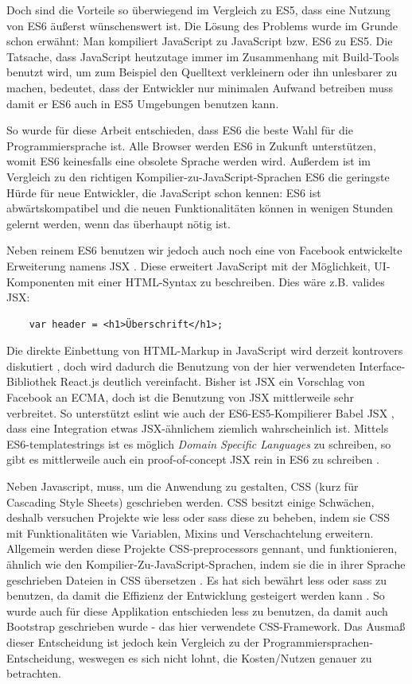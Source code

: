 \documentclass[12pt,twoside]{book}
\begin{document}
Doch sind die Vorteile so überwiegend im Vergleich zu ES5, dass eine Nutzung von ES6 äußerst wünschenswert ist.
Die Lösung des Problems wurde im Grunde schon erwähnt: Man kompiliert JavaScript zu JavaScript bzw. ES6 zu ES5.
Die Tatsache, dass JavaScript heutzutage immer im Zusammenhang mit Build-Tools benutzt wird, um zum Beispiel den Quelltext verkleinern oder ihn unlesbarer zu machen, bedeutet, dass der Entwickler nur minimalen Aufwand betreiben muss damit er ES6 auch in ES5 Umgebungen benutzen kann.

So wurde für diese Arbeit entschieden, dass ES6 die beste Wahl für die Programmiersprache ist. Alle Browser werden ES6 in Zukunft unterstützen, womit ES6 keinesfalls eine obsolete Sprache werden wird. Außerdem ist im Vergleich zu den richtigen Kompilier-zu-JavaScript-Sprachen ES6 die geringste Hürde für neue Entwickler, die JavaScript schon kennen: ES6 ist abwärtskompatibel und die neuen Funktionalitäten können in wenigen Stunden gelernt werden, wenn das überhaupt nötig ist.

Neben reinem ES6 benutzen wir jedoch auch noch eine von Facebook entwickelte Erweiterung namens JSX \cite{jsx}. Diese erweitert JavaScript mit der Möglichkeit, UI-Komponenten mit einer HTML-Syntax zu beschreiben. Dies wäre z.B. valides JSX:

\begin{verbatim}
    var header = <h1>Überschrift</h1>;
\end{verbatim}

Die direkte Einbettung von HTML-Markup in JavaScript wird derzeit kontrovers diskutiert \cite{jsxcontrovers}, doch wird dadurch die Benutzung von der hier verwendeten Interface-Bibliothek React.js deutlich vereinfacht.
Bisher ist JSX ein Vorschlag von Facebook an ECMA, doch ist die Benutzung von JSX mittlerweile sehr verbreitet. So unterstützt eslint \cite{eslint} wie auch der ES6-ES5-Kompilierer Babel JSX \cite{babel}, dass eine Integration etwas JSX-ähnlichem ziemlich wahrscheinlich ist.
Mittels ES6-templatestrings ist es möglich \textit{Domain Specific Languages} zu schreiben, so gibt es mittlerweile auch ein proof-of-concept JSX rein in ES6 zu schreiben \cite{templatestrings}.

Neben Javascript, muss, um die Anwendung zu gestalten, CSS (kurz für Cascading Style Sheets) geschrieben werden. CSS besitzt einige Schwächen, deshalb versuchen Projekte wie less oder sass diese zu beheben, indem sie CSS mit Funktionalitäten wie Variablen, Mixins und Verschachtelung erweitern.
Allgemein werden diese Projekte CSS-preprocessors gennant, und funktionieren,
ähnlich wie den Kompilier-Zu-JavaScript-Sprachen, indem sie die in ihrer Sprache geschrieben Dateien in CSS übersetzen \cite{csspre}.
Es hat sich bewährt less oder sass zu benutzen, da damit die Effizienz der Entwicklung gesteigert werden kann \cite{csspre}. So wurde auch für diese Applikation entschieden less zu benutzen, da damit auch Bootstrap geschrieben wurde - das hier verwendete CSS-Framework.
Das Ausmaß dieser Entscheidung ist jedoch kein Vergleich zu der Programmiersprachen-Entscheidung, weswegen es sich nicht lohnt, die Kosten/Nutzen genauer zu betrachten.
\end{document}
